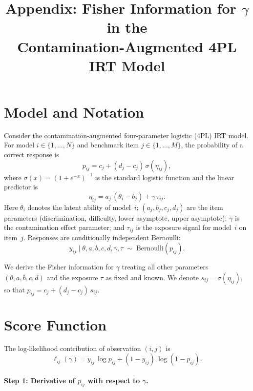 \documentclass[11pt,a4paper]{article}
\title{Appendix: Fisher Information for $\gamma$ in the\\
Contamination-Augmented 4PL IRT Model}
\author{}
\date{}
\theoremstyle{definition}
\begin{document}
\maketitle

\section{Model and Notation}\label{sec:notation}

Consider the contamination-augmented four-parameter logistic (4PL) IRT model.
For model $i \in \{1,\dots,N\}$ and benchmark item $j \in \{1,\dots,M\}$,
the probability of a correct response is
\begin{equation}\label{eq:4pl}
  p_{ij}
  = c_j + (d_j - c_j)\,\sigma(\eta_{ij}),
\end{equation}
where $\sigma(x) = (1+e^{-x})^{-1}$ is the standard logistic function and the
linear predictor is
\begin{equation}\label{eq:eta}
  \eta_{ij} = a_j\,(\theta_i - b_j) + \gamma\,\tau_{ij}.
\end{equation}
Here $\theta_i$ denotes the latent ability of model~$i$;
$(a_j, b_j, c_j, d_j)$ are the item parameters (discrimination, difficulty,
lower asymptote, upper asymptote);
$\gamma$ is the contamination effect parameter;
and $\tau_{ij}$ is the exposure signal for model~$i$ on item~$j$.
Responses are conditionally independent Bernoulli:
\begin{equation}\label{eq:bernoulli}
  y_{ij} \mid \theta, a, b, c, d, \gamma, \tau
  \;\sim\; \mathrm{Bernoulli}(p_{ij}).
\end{equation}

We derive the Fisher information for $\gamma$ treating all other parameters
$(\theta, a, b, c, d)$ and the exposure $\tau$ as fixed and known.
We denote $s_{ij} = \sigma(\eta_{ij})$, so that $p_{ij} = c_j + (d_j-c_j)\,s_{ij}$.

\section{Score Function}\label{sec:score}

The log-likelihood contribution of observation $(i,j)$ is
\begin{equation}\label{eq:loglik}
  \ell_{ij}(\gamma)
  = y_{ij}\,\log p_{ij} + (1-y_{ij})\,\log(1-p_{ij}).
\end{equation}

\paragraph{Step 1: Derivative of $p_{ij}$ with respect to $\gamma$.}
\end{document}
